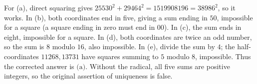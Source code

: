 For (a), direct squaring gives $25530^2+29464^2=1519908196=38986^2$, so it works. In (b), both coordinates end in five, giving a sum ending in $50$, impossible for a square (a square ending in zero must end in $00$). In (c), the sum ends in eight, impossible for a square. In (d), both coordinates are twice an odd number, so the sum is $8$ modulo $16$, also impossible. In (e), divide the sum by $4$; the half-coordinates $11268,13731$ have squares summing to $5$ modulo $8$, impossible. Thus the corrected answer is $\boxed{\text{(a)}}$. Without the radical, all five sums are positive integers, so the original assertion of uniqueness is false.
